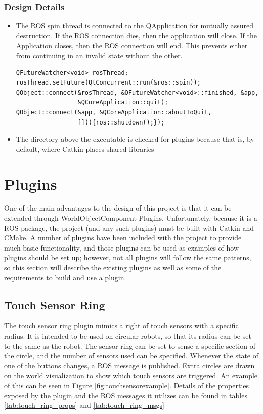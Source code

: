 \begin{itemize}
\subsubsection*{Design Details}
\begin{itemize}
	\item The ROS spin thread is connected to the QApplication for mutually assured destruction. If the ROS connection dies, then the application will close. If the Application closes, then the ROS connection will end. This prevents either from continuing in an invalid state without the other.
	\begin{lstlisting}
QFutureWatcher<void> rosThread;
rosThread.setFuture(QtConcurrent::run(&ros::spin));
QObject::connect(&rosThread, &QFutureWatcher<void>::finished, &app,
                 &QCoreApplication::quit);
QObject::connect(&app, &QCoreApplication::aboutToQuit,
                 [](){ros::shutdown();});
	\end{lstlisting}
	\item The directory above the executable is checked for plugins because that is, by default, where Catkin places shared libraries
\end{itemize}
\section{Plugins}
One of the main advantages to the design of this project is that it can be extended through WorldObjectComponent Plugins. Unfortunately, because it is a ROS package, the project (and any such plugins) must be built with Catkin and CMake. A number of plugins have been included with the project to provide much basic functionality, and those plugins can be used as examples of how plugins should be set up; however, not all plugins will follow the same patterns, so this section will describe the existing plugins as well as some of the requirements to build and use a plugin.
\subsection{Touch Sensor Ring}
The touch sensor ring plugin mimics a right of touch sensors with a specific radius. It is intended to be used on circular robots, so that its radius can be set to the same as the robot. 
	The sensor ring can be set to sense a specific section of the circle, and the number of sensors used can be specified. Whenever the state of one of the buttons changes, a ROS message is published. Extra circles are drawn on the world visualization to show which touch sensors are triggered. An example of this can be seen in Figure \ref{fig:touchsensorexample}. Details of the properties exposed by the plugin and the ROS messages it utilizes can be found in tables \ref{tab:touch_ring_props} and \ref{tab:touch_ring_msgs}
	

\end{itemize}

